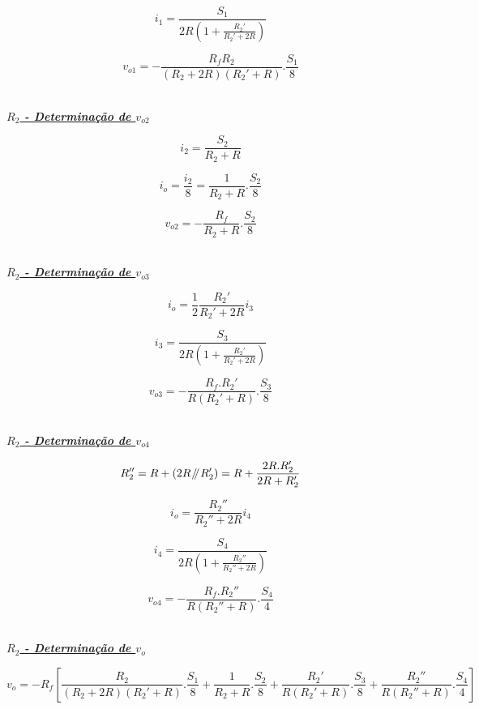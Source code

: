 \documentclass[a4paper,11pt]{report}
\newcommand{\parallelsum}{\mathbin{\!/\mkern-5mu/\!}} %
\begin{document}
$$i_1=\frac{S_1}{2R\left(1+\frac{R_2'}{R_2'+2R}\right)}$$

$$v_{o1}=-\frac{R_fR_2}{\left(R_2+2R\right)\left(R_2'+R\right)}.\frac{S_1}{8}$$\\

\par

\large\underline{\textit{\textbf{$R_2$ - Determinação de $v_{o2}$}}}\\
\par

$$i_2=\frac{S_2}{R_2+R}$$

$$i_o=\frac{i_2}{8}=\frac{1}{R_2+R}.\frac{S_2}{8}$$

$$v_{o2}=-\frac{R_f}{R_2+R}.\frac{S_2}{8}$$\\

\par

\large\underline{\textit{\textbf{$R_2$ - Determinação de $v_{o3}$}}}\\
\par

$$i_o=\frac{1}{2}\frac{R_2'}{R_2'+2R}i_3$$

$$i_3=\frac{S_3}{2R\left(1+\frac{R_2'}{R_2'+2R}\right)}$$

$$v_{o3}=-\frac{R_f.R_2'}{R\left(R_2'+R\right)}.\frac{S_3}{8}$$\\

\par

\large\underline{\textit{\textbf{$R_2$ - Determinação de $v_{o4}$}}}\\
\par

$$R_2''=R+\left(2R\parallelsum R_2'\right)=R+\frac{2R.R_2'}{2R+R_2'}$$

$$i_o=\frac{R_2''}{R_2''+2R}i_4$$

$$i_4=\frac{S_4}{2R\left(1+\frac{R_2''}{R_2''+2R}\right)}$$

$$v_{o4}=-\frac{R_f.R_2''}{R\left(R_2''+R\right)}.\frac{S_4}{4}$$\\

\par

\large\underline{\textit{\textbf{$R_2$ - Determinação de $v_{o}$}}}\\
\par

$$v_o=-R_f\left[\frac{R_2}{\left(R_2+2R\right)\left(R_2'+R\right)}.\frac{S_1}{8}+\frac{1}{R_2+R}.\frac{S_2}{8}+\frac{R_2'}{R\left(R_2'+R\right)}.\frac{S_3}{8}+\frac{R_2''}{R\left(R_2''+R\right)}.\frac{S_4}{4}\right]$$
\end{document}
